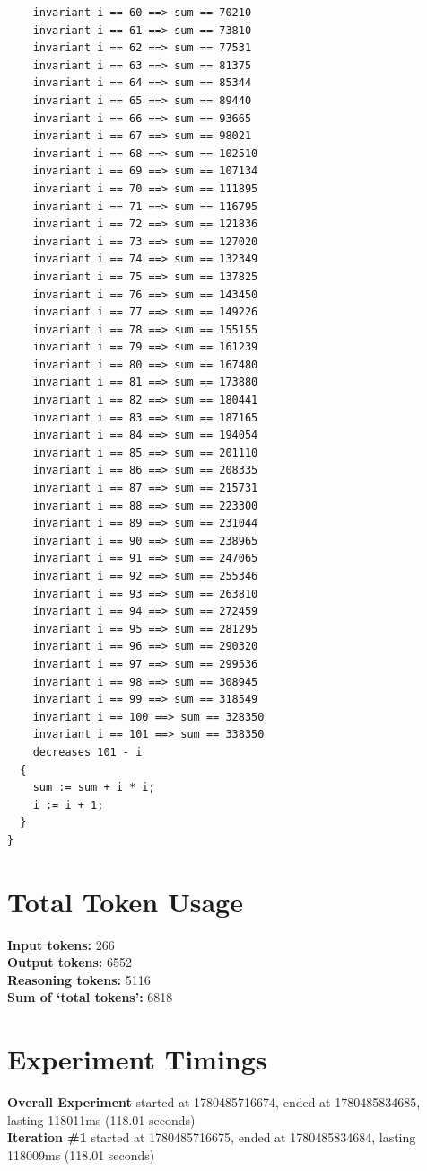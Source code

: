 \documentclass{article}
\begin{document}
\begin{lstlisting}
    invariant i == 60 ==> sum == 70210
    invariant i == 61 ==> sum == 73810
    invariant i == 62 ==> sum == 77531
    invariant i == 63 ==> sum == 81375
    invariant i == 64 ==> sum == 85344
    invariant i == 65 ==> sum == 89440
    invariant i == 66 ==> sum == 93665
    invariant i == 67 ==> sum == 98021
    invariant i == 68 ==> sum == 102510
    invariant i == 69 ==> sum == 107134
    invariant i == 70 ==> sum == 111895
    invariant i == 71 ==> sum == 116795
    invariant i == 72 ==> sum == 121836
    invariant i == 73 ==> sum == 127020
    invariant i == 74 ==> sum == 132349
    invariant i == 75 ==> sum == 137825
    invariant i == 76 ==> sum == 143450
    invariant i == 77 ==> sum == 149226
    invariant i == 78 ==> sum == 155155
    invariant i == 79 ==> sum == 161239
    invariant i == 80 ==> sum == 167480
    invariant i == 81 ==> sum == 173880
    invariant i == 82 ==> sum == 180441
    invariant i == 83 ==> sum == 187165
    invariant i == 84 ==> sum == 194054
    invariant i == 85 ==> sum == 201110
    invariant i == 86 ==> sum == 208335
    invariant i == 87 ==> sum == 215731
    invariant i == 88 ==> sum == 223300
    invariant i == 89 ==> sum == 231044
    invariant i == 90 ==> sum == 238965
    invariant i == 91 ==> sum == 247065
    invariant i == 92 ==> sum == 255346
    invariant i == 93 ==> sum == 263810
    invariant i == 94 ==> sum == 272459
    invariant i == 95 ==> sum == 281295
    invariant i == 96 ==> sum == 290320
    invariant i == 97 ==> sum == 299536
    invariant i == 98 ==> sum == 308945
    invariant i == 99 ==> sum == 318549
    invariant i == 100 ==> sum == 328350
    invariant i == 101 ==> sum == 338350
    decreases 101 - i
  {
    sum := sum + i * i;
    i := i + 1;
  }
}
\end{lstlisting}
\section*{Total Token Usage}
\textbf{Input tokens: }266
\\\textbf{Output tokens: }6552
\\\textbf{Reasoning tokens: }5116
\\\textbf{Sum of `total tokens': }6818
\section*{Experiment Timings}
\textbf{Overall Experiment} started at 1780485716674, ended at 1780485834685, lasting 118011ms (118.01 seconds)
\\\textbf{Iteration \#1} started at 1780485716675, ended at 1780485834684, lasting 118009ms (118.01 seconds)
\end{document}
